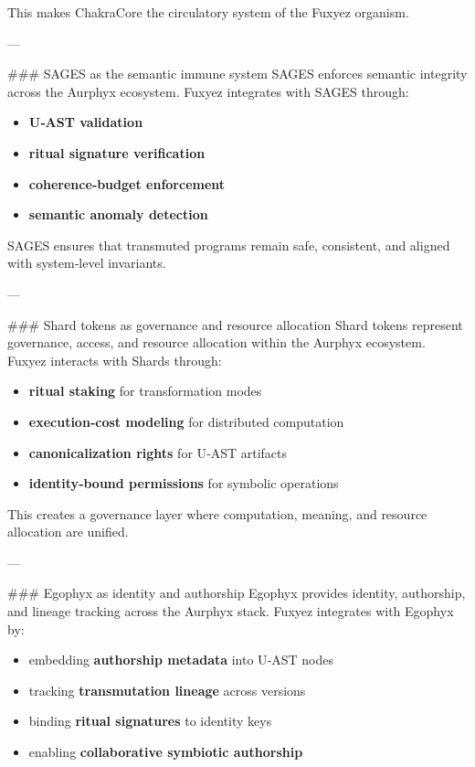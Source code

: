 \begin{enumerate}
This makes ChakraCore the circulatory system of the Fuxyez organism.

---

\#\#\# SAGES as the semantic immune system  
SAGES enforces semantic integrity across the Aurphyx ecosystem. Fuxyez integrates with SAGES through:

\begin{itemize}
  \item \textbf{U‑AST validation}  
  \item \textbf{ritual signature verification}  
  \item \textbf{coherence‑budget enforcement}  
  \item \textbf{semantic anomaly detection}  
\end{itemize}

SAGES ensures that transmuted programs remain safe, consistent, and aligned with system‑level invariants.

---

\#\#\# Shard tokens as governance and resource allocation  
Shard tokens represent governance, access, and resource allocation within the Aurphyx ecosystem. Fuxyez interacts with Shards through:

\begin{itemize}
  \item \textbf{ritual staking} for transformation modes  
  \item \textbf{execution‑cost modeling} for distributed computation  
  \item \textbf{canonicalization rights} for U‑AST artifacts  
  \item \textbf{identity‑bound permissions} for symbolic operations  
\end{itemize}

This creates a governance layer where computation, meaning, and resource allocation are unified.

---

\#\#\# Egophyx as identity and authorship  
Egophyx provides identity, authorship, and lineage tracking across the Aurphyx stack. Fuxyez integrates with Egophyx by:

\begin{itemize}
  \item embedding \textbf{authorship metadata} into U‑AST nodes  
  \item tracking \textbf{transmutation lineage} across versions  
  \item binding \textbf{ritual signatures} to identity keys  
  \item enabling \textbf{collaborative symbiotic authorship}  
\end{itemize}


\end{enumerate}
